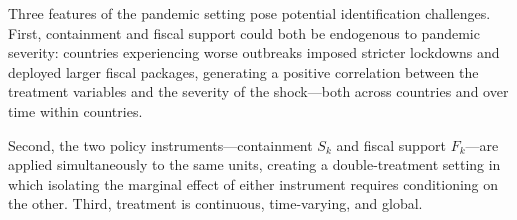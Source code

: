 \documentclass[12pt, a4paper]{article}
\begin{document}
Three features of the pandemic setting pose potential identification challenges. First, containment and fiscal support could both be endogenous to pandemic severity: countries experiencing worse outbreaks imposed stricter lockdowns and deployed larger fiscal packages, generating a positive correlation between the treatment variables and the severity of the shock---both across countries and over time within countries.

Second, the two policy instruments---containment $S_k$ and fiscal support
$F_k$---are applied simultaneously to the same units, creating a double-treatment
setting in which isolating the marginal effect of either instrument requires
conditioning on the other. Third, treatment is continuous, time-varying, and global.
\end{document}
